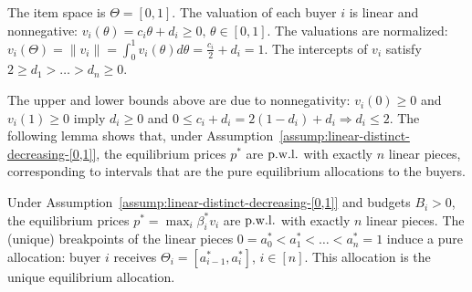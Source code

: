 \begin{assumption}
	The item space is $\Theta = [0,1]$. 
	The valuation of each buyer $i$ is linear and nonnegative: 
	$v_i(\theta) = c_i \theta + d_i \geq 0, \, \theta\in [0,1]$.
	The valuations are normalized:
	$v_i(\Theta) = \|v_i\| = \int_0^1 v_i(\theta) d\theta = \frac{c_i}{2} + d_i = 1$.
	The intercepts of $v_i$ satisfy
	$2 \geq d_1 > \dots > d_n \geq 0$.
	\label{assump:linear-distinct-decreasing-[0,1]}
\end{assumption}
The upper and lower bounds above are due to nonnegativity: $v_i(0) \geq 0$ and $v_i(1) \geq 0$ imply $d_i \geq 0$ and $0 \leq c_i + d_i = 2(1-d_i) + d_i \Rightarrow d_i \leq 2$. The following lemma shows that, under Assumption~\ref{assump:linear-distinct-decreasing-[0,1]}, the equilibrium prices $p^*$ are ${\rm p.w.l.}$ with exactly $n$ linear pieces, corresponding to intervals that are the pure equilibrium allocations to the buyers.
\begin{lemma}
	Under Assumption~\ref{assump:linear-distinct-decreasing-[0,1]} and budgets $B_i > 0$, the equilibrium prices $p^* = \max_i \beta^*_i v_i$ are ${\rm p.w.l.}$ with exactly $n$ linear pieces.
	The (unique) breakpoints of the linear pieces $0 = a^*_0 < a^*_1 < \dots < a^*_n = 1$ induce a pure allocation: buyer $i$ receives $\Theta_i = [a^*_{i-1}, a^*_i]$, $i\in [n]$. This allocation is the unique equilibrium allocation.
	\label{lemma:all-linear-equilibrium-geometry}
\end{lemma}	
